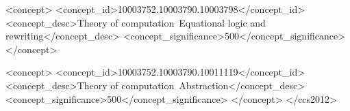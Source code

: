 \documentclass[sigplan,10pt, review]{acmart}\settopmatter{printfolios=true,printccs=false,printacmref=false}
\begin{document}
%
%
\begin{CCSXML}

<concept>
<concept_id>10003752.10003790.10003798</concept_id>
 <concept_desc>Theory of computation~Equational logic and rewriting</concept_desc>
<concept_significance>500</concept_significance>
</concept>

<concept>
<concept_id>10003752.10003790.10011119</concept_id>
 <concept_desc>Theory of computation~Abstraction</concept_desc>
<concept_significance>500</concept_significance>
</concept>
</ccs2012>


\end{CCSXML}


%




\maketitle


\renewcommand{\shortauthors}{I. Roessle et al.}


%



%
%
\end{document}
